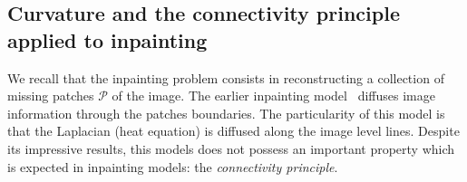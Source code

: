 \subsection{Curvature and the connectivity principle applied to inpainting}

We recall that the inpainting problem consists in reconstructing a collection of missing patches $\mathcal{P}$ of the image. The earlier inpainting model~\cite{bertalmio00image}  diffuses image information through the patches boundaries. The particularity of this model is that the Laplacian (heat equation) is diffused along the image level lines. Despite its impressive results, this models does not possess an important property which is expected in inpainting models: the \emph{connectivity principle}.


\begin{figure}
\center
{}\hspace{3em}
\end{figure}
